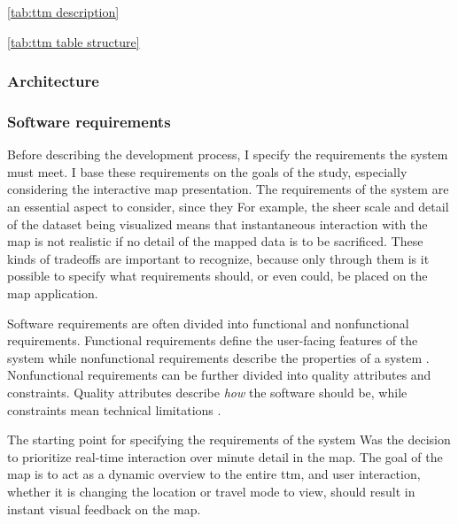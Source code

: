 \ref{tab:ttm description}



\ref{tab:ttm table structure}




\subsubsection{Architecture}


\subsubsection{Software requirements}

Before describing the development process,
I specify the requirements the system must meet.
I base these requirements on the goals of the study,
especially considering the interactive map presentation.
The requirements of the system are an essential aspect to consider,
since they  %
For example, the sheer scale and detail of the dataset being visualized
means that instantaneous interaction with the map is not realistic
if no detail of the mapped data is to be sacrificed.
These kinds of tradeoffs are important to recognize,
because only through them is it possible to specify what
requirements should, or even could, be placed on the map application.

Software requirements are often divided into
functional and nonfunctional requirements.
Functional requirements define the user-facing features of the system
while nonfunctional requirements describe the properties of a system
\parencite{chu2009}.
Nonfunctional requirements can be further divided into
quality attributes and constraints.
Quality attributes describe \textit{how} the software should be,
while constraints mean technical limitations \parencite{chu2009}.

The starting point for specifying the requirements of the system
Was the decision to prioritize real-time interaction over minute detail in the map.
The goal of the map is to act as a dynamic overview to the entire \acrshort{ttm},
and user interaction, whether it is changing the location or travel mode to view,
should result in instant visual feedback on the map.

